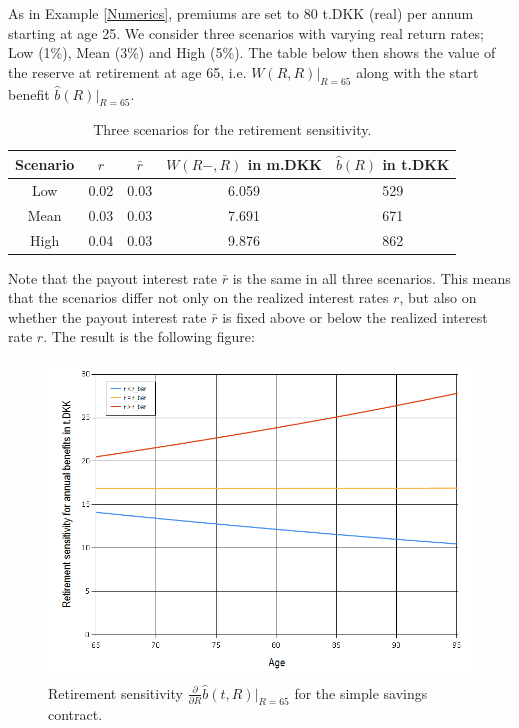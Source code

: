 \documentclass{article}
\newcommand{\1}[1]{\mathbbm{1}_{\left\lbrace #1 \right\rbrace}}
\theoremstyle{break}
\theoremstyle{remark}
\numberwithin{equation}{section}
\begin{document}
\begin{example} \label{SensNumerics}
As in Example \ref{Numerics}, premiums are set to 80 t.DKK (real) per annum starting at age 25. We consider three scenarios with varying real return rates; Low (1\%), Mean (3\%) and High (5\%). The table below then shows the value of the reserve at retirement at age 65, i.e. $W(R,R)|_{R=65}$ along with the start benefit $\hat{b}(R)|_{R=65}$.

\begin{table}[H]
	\caption{Three scenarios for the retirement sensitivity.}
	\begin{center}
	\begin{tabular}{ |c|c|c|c|c| }
		\hline
		Scenario & $r$ & $\bar{r}$ & $W(R-,R)$ in m.DKK & $\hat{b}(R)$ in t.DKK \\
		\hline
		Low & 0.02 & 0.03 & 6.059 & 529 \\
		Mean & 0.03 & 0.03 & 7.691 & 671 \\
		High & 0.04 & 0.03 & 9.876 & 862 \\
		\hline
	\end{tabular}
\end{center}
\end{table}

Note that the payout interest rate $\bar{r}$ is the same in all three scenarios. This means that the scenarios differ not only on the realized interest rates $r$, but also on whether the payout interest rate $\bar{r}$ is fixed above or below the realized interest rate $r$. The result is the following figure:

\begin{figure}[H] \label{RSensiGraph}
	\centering
	\caption{Retirement sensitivity $\frac{\partial}{\partial R} \hat{b}(t,R)|_{R=65}$ for the simple savings contract.}
	\includegraphics[width=\textwidth]{Rsensi}		
\end{figure}


\end{example}
\end{document}
